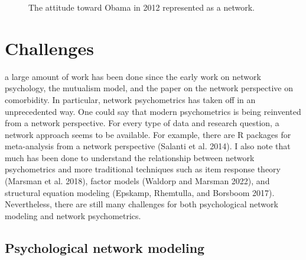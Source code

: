\documentclass[
  a4paper,
  DIV=11,
  numbers=noendperiod,
  oneside]{scrreprt}
\begin{document}
\begin{figure}


\caption{\label{fig-ch6-img19-old-88}The attitude toward Obama in 2012
represented as a network.}

\end{figure}%

\section{Challenges}\label{sec-Challenges}

a large amount of work has been done since the early work on network
psychology, the mutualism model, and the paper on the network
perspective on comorbidity. In particular, network psychometrics has
taken off in an unprecedented way. One could say that modern
psychometrics is being reinvented from a network perspective. For every
type of data and research question, a network approach seems to be
available. For example, there are R packages for meta-analysis from a
network perspective (Salanti et al. 2014). I also note that much has
been done to understand the relationship between network psychometrics
and more traditional techniques such as item response theory (Marsman et
al. 2018), factor models (Waldorp and Marsman 2022), and structural
equation modeling (Epskamp, Rhemtulla, and Borsboom 2017). Nevertheless,
there are still many challenges for both psychological network modeling
and network psychometrics.

\subsection{Psychological network
modeling}\label{sec-Psychological-network-modelling}
\end{document}
